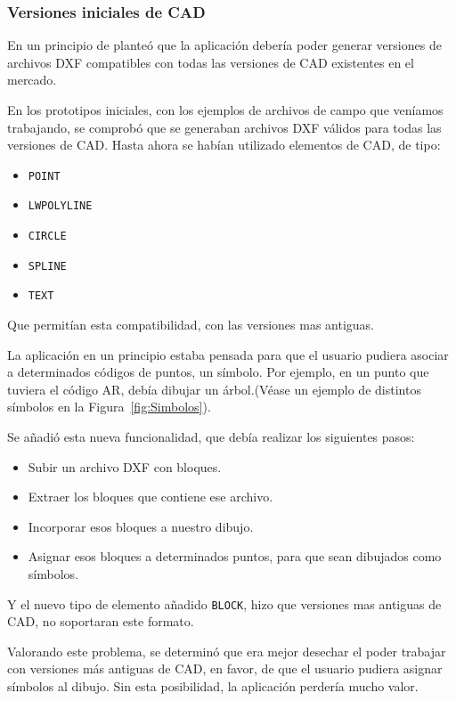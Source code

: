 \subsubsection{Versiones iniciales de CAD}

En un principio de planteó que la aplicación debería poder generar versiones de archivos DXF compatibles con todas las versiones de CAD existentes en el mercado.

En los prototipos iniciales, con los ejemplos de archivos de campo que veníamos trabajando, se comprobó que se generaban archivos DXF válidos para todas las versiones de CAD. Hasta ahora se habían utilizado elementos de CAD, de tipo:

\begin{itemize}
\item \texttt{POINT}
\item \texttt{LWPOLYLINE}
\item \texttt{CIRCLE}
\item \texttt{SPLINE}
\item \texttt{TEXT}
\end{itemize}

Que permitían esta compatibilidad, con las versiones mas antiguas.   

La aplicación en un principio estaba pensada para que el usuario pudiera asociar   a determinados códigos de puntos, un símbolo. Por ejemplo, en un punto que tuviera el código AR, debía dibujar un árbol.(Véase un ejemplo de distintos símbolos en la Figura~\ref{fig:Simbolos}).

Se añadió esta nueva funcionalidad, que debía realizar los siguientes pasos:

\begin{itemize}
\item Subir un archivo DXF con bloques.
\item Extraer los bloques que contiene ese archivo.
\item Incorporar esos bloques a nuestro dibujo.
\item Asignar esos bloques a determinados puntos, para que sean dibujados como símbolos.
\end{itemize}

Y el nuevo tipo de elemento añadido \texttt{BLOCK}, hizo que versiones mas antiguas de CAD, no soportaran este formato.

Valorando este problema, se determinó que era mejor desechar el poder trabajar con versiones más antiguas de CAD, en favor, de que el usuario pudiera asignar símbolos al dibujo. Sin esta posibilidad, la aplicación perdería mucho valor.


